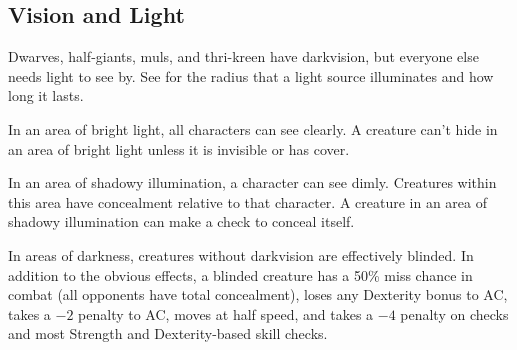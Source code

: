 \subsection{Vision and Light}
Dwarves, half-giants, muls, and thri-kreen have darkvision, but everyone else needs light to see by. See  for the radius that a light source illuminates and how long it lasts.

In an area of bright light, all characters can see clearly. A creature can't hide in an area of bright light unless it is invisible or has cover.

In an area of shadowy illumination, a character can see dimly. Creatures within this area have concealment relative to that character. A creature in an area of shadowy illumination can make a  check to conceal itself.

In areas of darkness, creatures without darkvision are effectively blinded. In addition to the obvious effects, a blinded creature has a 50\% miss chance in combat (all opponents have total concealment), loses any Dexterity bonus to AC, takes a $-2$ penalty to AC, moves at half speed, and takes a $-4$ penalty on  checks and most Strength and Dexterity-based skill checks.


